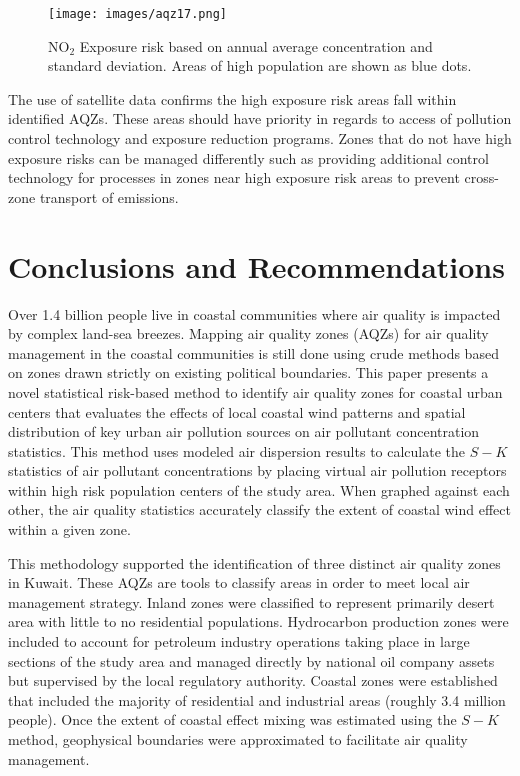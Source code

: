 %
\begin{figure}
\texttt{[image: images/aqz17.png]} 
\caption{NO$_{2}$ Exposure risk based on annual average concentration and standard deviation. Areas of high population are shown as blue dots.}
\label{fig:176riskNO2}
\end{figure}
%

The use of satellite data confirms the high exposure risk areas fall within identified AQZs.  These areas should have priority in regards to access of pollution control technology and exposure reduction programs.  Zones that do not have high exposure risks can be managed differently such as providing additional control technology for processes in zones near high exposure risk areas to prevent cross-zone transport of emissions. 

\section{Conclusions and Recommendations}
Over 1.4 billion people live in coastal communities where air quality is impacted by complex land-sea breezes.  Mapping air quality zones (AQZs) for air quality management in the coastal communities is still done using crude methods based on zones drawn strictly on existing political boundaries. This paper presents a novel statistical risk-based method to identify air quality zones for coastal urban centers that evaluates the effects of local coastal wind patterns and spatial distribution of key urban air pollution sources on air pollutant concentration statistics.  This method uses modeled air dispersion results to calculate the $S-K$ statistics of air pollutant concentrations by placing virtual air pollution receptors within high risk population centers of the study area.  When graphed against each other, the air quality statistics accurately classify the extent of coastal wind effect within a given zone.
 
This methodology supported the identification of three distinct air quality zones in Kuwait.  These AQZs are tools to classify areas in order to meet local air management strategy.  Inland zones were classified to represent primarily desert area with little to no residential populations.  Hydrocarbon production zones were included to account for petroleum industry operations taking place in large sections of the study area and managed directly by national oil company assets but supervised by the local regulatory authority.  Coastal zones were established that included the majority of residential and industrial areas (roughly 3.4 million people).  Once the extent of coastal effect mixing was estimated using the $S-K$ method, geophysical boundaries were approximated to facilitate air quality management. 

